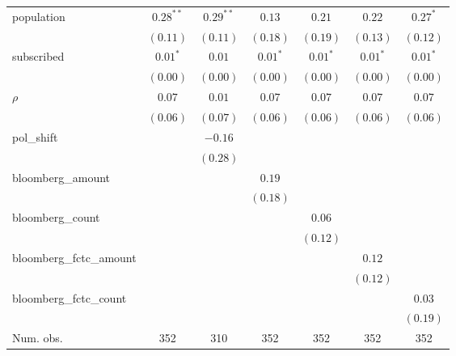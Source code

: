 \begin{table}[!h]
\begin{center}
\begin{tabular}{l c c c c c c }
population              & $0.28^{**}$  & $0.29^{**}$  & $0.13$       & $0.21$       & $0.22$       & $0.27^{*}$   \\
                        & $(0.11)$     & $(0.11)$     & $(0.18)$     & $(0.19)$     & $(0.13)$     & $(0.12)$     \\
subscribed              & $0.01^{*}$   & $0.01$       & $0.01^{*}$   & $0.01^{*}$   & $0.01^{*}$   & $0.01^{*}$   \\
                        & $(0.00)$     & $(0.00)$     & $(0.00)$     & $(0.00)$     & $(0.00)$     & $(0.00)$     \\
$\rho$                  & $0.07$       & $0.01$       & $0.07$       & $0.07$       & $0.07$       & $0.07$       \\
                        & $(0.06)$     & $(0.07)$     & $(0.06)$     & $(0.06)$     & $(0.06)$     & $(0.06)$     \\
pol\_shift              &              & $-0.16$      &              &              &              &              \\
                        &              & $(0.28)$     &              &              &              &              \\
bloomberg\_amount       &              &              & $0.19$       &              &              &              \\
                        &              &              & $(0.18)$     &              &              &              \\
bloomberg\_count        &              &              &              & $0.06$       &              &              \\
                        &              &              &              & $(0.12)$     &              &              \\
bloomberg\_fctc\_amount &              &              &              &              & $0.12$       &              \\
                        &              &              &              &              & $(0.12)$     &              \\
bloomberg\_fctc\_count  &              &              &              &              &              & $0.03$       \\
                        &              &              &              &              &              & $(0.19)$     \\
\midrule
Num. obs.               & 352          & 310          & 352          & 352          & 352          & 352          \\

\end{tabular}
\end{center}
\end{table}
